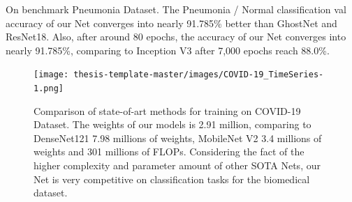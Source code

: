 On benchmark Pneumonia Dataset\cite{38}. The Pneumonia / Normal classification val accuracy of our Net converges into nearly 91.785\% better than GhostNet and ResNet18. Also, after around 80 epochs, the accuracy of our Net converges into nearly 91.785\%, comparing to  Inception V3 after 7,000 epochs reach 88.0\%\cite{38}.

\begin{figure}[h]
\centering
\texttt{[image: thesis-template-master/images/COVID-19\_TimeSeries-1.png]}
\label{fig}
\centering
\caption{ Comparison of state-of-art methods for training on COVID-19 Dataset.  The weights of our models is 2.91 million, comparing to DenseNet121 7.98 millions of weights, MobileNet V2 3.4 millions of weights and 301 millions of FLOPs. Considering the fact of the higher complexity and parameter amount of other SOTA Nets, our Net is very competitive on classification tasks for the biomedical dataset. }
\end{figure}

